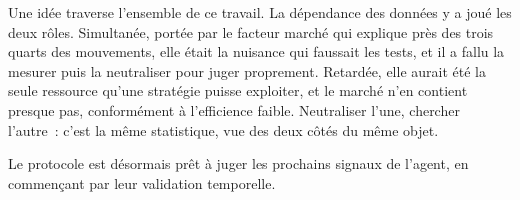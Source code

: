 Une idée traverse l'ensemble de ce travail. La dépendance des données y
a joué les deux rôles. Simultanée, portée par le facteur marché qui
explique près des trois quarts des mouvements, elle était la nuisance
qui faussait les tests, et il a fallu la mesurer puis la neutraliser
pour juger proprement. Retardée, elle aurait été la seule ressource
qu'une stratégie puisse exploiter, et le marché n'en contient presque
pas, conformément à l'efficience faible. Neutraliser l'une, chercher
l'autre~: c'est la même statistique, vue des deux côtés du même objet.

Le protocole est désormais prêt à juger les prochains signaux de
l'agent, en commençant par leur validation temporelle.
